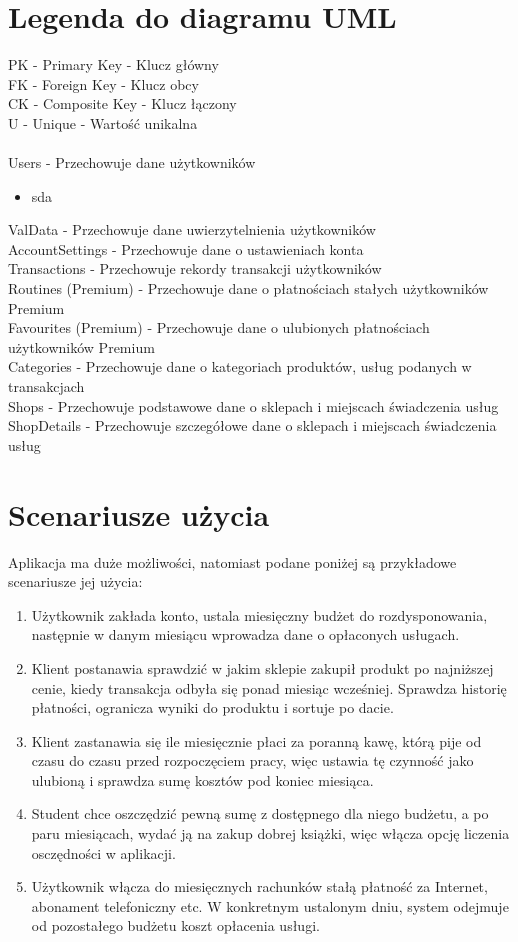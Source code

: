 \documentclass{article}
\begin{document}
    \section{Legenda do diagramu UML}
    PK - Primary Key - Klucz główny
    \\FK - Foreign Key - Klucz obcy
    \\CK - Composite Key - Klucz łączony
    \\U - Unique - Wartość unikalna
    \\
    \\Users - Przechowuje dane użytkowników
    \begin{itemize}
    \item sda
    \end{itemize}
    ValData - Przechowuje dane uwierzytelnienia użytkowników
    \\AccountSettings - Przechowuje dane o ustawieniach konta
    \\Transactions - Przechowuje rekordy transakcji użytkowników
    \\Routines (Premium) - Przechowuje dane o płatnościach stałych użytkowników Premium
    \\Favourites (Premium) - Przechowuje dane o ulubionych płatnościach użytkowników Premium
    \\Categories - Przechowuje dane o kategoriach produktów, usług podanych w transakcjach
    \\Shops - Przechowuje podstawowe dane o sklepach i miejscach świadczenia usług
    \\ShopDetails - Przechowuje szczegółowe dane o sklepach i miejscach świadczenia usług
    
    \section{Scenariusze użycia}
    Aplikacja ma duże możliwości, natomiast podane poniżej są przykładowe scenariusze jej użycia:
    \begin{enumerate}
    \item Użytkownik zakłada konto, ustala miesięczny budżet do rozdysponowania, następnie w danym miesiącu wprowadza dane o opłaconych usługach.
    \item Klient postanawia sprawdzić w jakim sklepie zakupił produkt po najniższej cenie, kiedy transakcja odbyła się ponad miesiąc wcześniej. Sprawdza historię płatności, ogranicza wyniki do produktu i sortuje po dacie.
    \item Klient zastanawia się ile miesięcznie płaci za poranną kawę, którą pije od czasu do czasu przed rozpoczęciem pracy, więc ustawia tę czynność jako ulubioną i sprawdza sumę kosztów pod koniec miesiąca.
    \item Student chce oszczędzić pewną sumę z dostępnego dla niego budżetu, a po paru miesiącach, wydać ją na zakup dobrej książki, więc włącza opcję liczenia osczędności w aplikacji.
    \item Użytkownik włącza do miesięcznych rachunków stałą płatność za Internet, abonament telefoniczny etc. W konkretnym ustalonym dniu, system odejmuje od pozostałego budżetu koszt opłacenia usługi.
    \end{enumerate}
    
\end{document}
